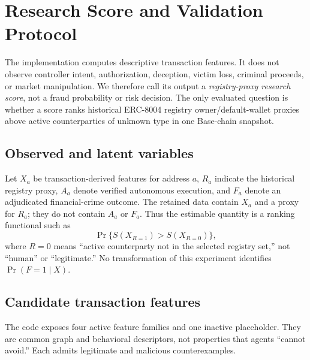 
\section{Research Score and Validation Protocol}\label{sec:detection}

The implementation computes descriptive transaction features.  It does not
observe controller intent, authorization, deception, victim loss, criminal
proceeds, or market manipulation.  We therefore call its output a
\emph{registry-proxy research score}, not a fraud probability or risk decision.
The only evaluated question is whether a score ranks historical ERC-8004
registry owner/default-wallet proxies above active counterparties of unknown
type in one Base-chain snapshot.

\subsection{Observed and latent variables}

Let $X_a$ be transaction-derived features for address $a$, $R_a$ indicate the
historical registry proxy, $A_a$ denote verified autonomous execution, and
$F_a$ denote an adjudicated financial-crime outcome.  The retained data contain
$X_a$ and a proxy for $R_a$; they do not contain $A_a$ or $F_a$.  Thus the
estimable quantity is a ranking functional such as
\begin{equation}
  \Pr\{S(X_{R=1}) > S(X_{R=0})\},
\end{equation}
where $R=0$ means ``active counterparty not in the selected registry set,'' not
``human'' or ``legitimate.''  No transformation of this experiment identifies
$\Pr(F=1\mid X)$.

\subsection{Candidate transaction features}

The code exposes four active feature families and one inactive placeholder.
They are common graph and behavioral descriptors, not properties that agents
``cannot avoid.''  Each admits legitimate and malicious counterexamples.

